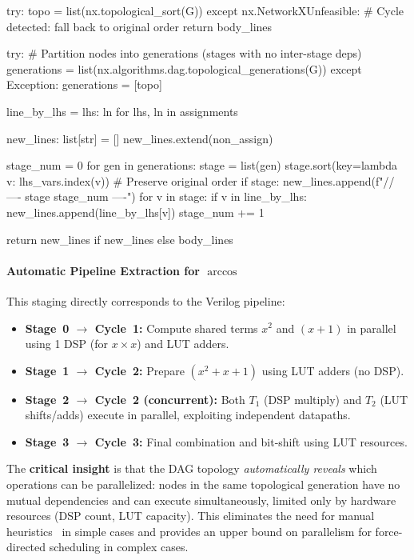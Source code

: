 \begin{python}
    try:
        topo = list(nx.topological_sort(G))
    except nx.NetworkXUnfeasible:
        # Cycle detected: fall back to original order
        return body_lines

    try:
        # Partition nodes into generations (stages with no inter-stage deps)
        generations = list(nx.algorithms.dag.topological_generations(G))
    except Exception:
        generations = [topo]

    line_by_lhs = {lhs: ln for lhs, ln in assignments}

    new_lines: list[str] = []
    new_lines.extend(non_assign)

    stage_num = 0
    for gen in generations:
        stage = list(gen)
        stage.sort(key=lambda v: lhs_vars.index(v))  # Preserve original order
        if stage:
            new_lines.append(f"// ---- stage {stage_num} ----")
            for v in stage:
                if v in line_by_lhs:
                    new_lines.append(line_by_lhs[v])
            stage_num += 1

    return new_lines if new_lines else body_lines
\end{python}

\paragraph{Automatic Pipeline Extraction for $\arccos$}

\noindent This staging directly corresponds to the Verilog pipeline:
\begin{itemize}
    \item \textbf{Stage~0 $\to$ Cycle~1:} Compute shared terms $x^2$ and $(x+1)$ in parallel using 1 DSP (for $x \times x$) and LUT adders.
    \item \textbf{Stage~1 $\to$ Cycle~2:} Prepare $(x^2 + x + 1)$ using LUT adders (no DSP).
    \item \textbf{Stage~2 $\to$ Cycle~2 (concurrent):} Both $T_1$ (DSP multiply) and $T_2$ (LUT shifts/adds) execute in parallel, exploiting independent datapaths.
    \item \textbf{Stage~3 $\to$ Cycle~3:} Final combination and bit-shift using LUT resources.
\end{itemize}

The \textbf{critical insight} is that the DAG topology \emph{automatically reveals} which operations can be parallelized: nodes in the same topological generation have no mutual dependencies and can execute simultaneously, limited only by hardware resources (DSP count, LUT capacity). This eliminates the need for manual heuristics~\cite{Mehdizadeh2004,Gustafsson2007} in simple cases and provides an upper bound on parallelism for force-directed scheduling in complex cases.

